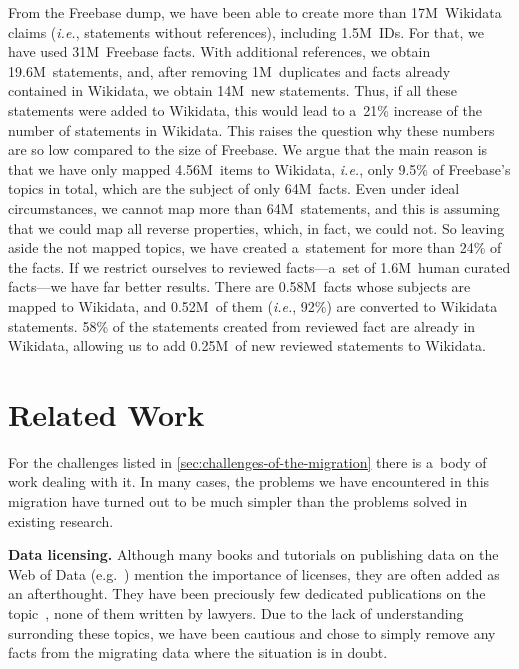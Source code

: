 \documentclass{acm_proc_article-sp}
\begin{document}
From the Freebase dump, we have been able to create more than 17M~Wikidata claims
(\emph{i.e.}, statements without references), including 1.5M~IDs.
For that, we have used 31M~Freebase facts.
With additional references, we obtain 19.6M~statements, and, after removing 1M~duplicates
and facts already contained in Wikidata, we obtain 14M~new statements.
Thus, if all these statements were added to Wikidata,
this would lead to a~21\% increase of the number of statements in Wikidata.
This raises the question why these numbers are so low compared to the size of Freebase.
We argue that the main reason is that we have only mapped 4.56M~items to Wikidata,
\emph{i.e.}, only 9.5\% of Freebase's topics in total, which are the subject of only 64M~facts.
Even under ideal circumstances, we cannot map more than 64M~statements,
and this is assuming that we could map all reverse properties, which, in fact, we could not.
So leaving aside the not mapped topics, we have created a~statement for more than 24\% of the facts.
If we restrict ourselves to reviewed facts---a~set of 1.6M~human curated facts---we have far better results.
There are 0.58M~facts whose subjects are mapped to Wikidata, and 0.52M~of them
(\emph{i.e.}, 92\%) are converted to Wikidata statements.
58\% of the statements created from reviewed fact are already in Wikidata,
allowing us to add 0.25M~of new reviewed statements to Wikidata.

\section{Related Work}\label{sec:related-work}

For the challenges listed in \autoref{sec:challenges-of-the-migration}
there is a~body of work dealing with it. In many cases, the problems we have encountered in
this migration have turned out to be much simpler than the problems solved in existing research.

\textbf{Data licensing.}
Although many books and tutorials on publishing data on the Web of Data
(e.g.~\cite{linkeddatabook,linkeddatabestpractises}) mention the importance of licenses,
they are often added as an afterthought.
They have been preciously few dedicated publications on the
topic~\cite{licenses,licensius}, none of them written by lawyers.
Due to the lack of understanding surronding these topics, we have been
cautious and chose to simply remove any facts from the migrating data
where the situation is in doubt.
\end{document}

